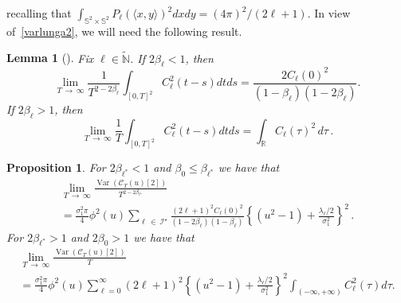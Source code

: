 \documentclass[10pt]{amsart}
\newtheorem{lemm}[theo]{Lemma}\newtheorem{prop}[theo]{Proposition}\newtheorem{coro}[theo]{Corollary}\newtheorem{conj}[theo]{Conjecture}
\theoremstyle{definition}\newtheorem{defi}[theo]{Definition}\newtheorem{rema}[theo]{Remark}\newtheorem{exam}[theo]{Example}\newtheorem{exem}[theo]{Example}\newtheorem{nota}[theo]{Notation}
\newcommand{\clI}{\mathcal{I}}
\newcommand{\clC}{\mathcal{C}}
\newcommand{\bbS}{\mathbb{S}}
\newcommand{\bbR}{\mathbb{R}}
\newcommand{\bbN}{\mathbb{N}}
\DeclareMathOperator{\Var}{Var}
\begin{document}
\endgroup
\noindent recalling that $\int_{\bbS^{2}\times \bbS^{2}}P_{\ell }(\langle x,y\rangle)^{2}dxdy = (4\pi)^2/(2\ell+1)$. In view of~\eqref{varlunga2}, we will need the following result.

\begin{lemm}[{\cite[Lem\-ma~4.3]{MRV:20}}]\label{lemma-var2nd}
Fix $\ell \in \widetilde{ \bbN}$. If $2\beta _{\ell}<1$, then
\begin{equation*}
\lim_{T\,\rightarrow\,\infty}\frac{1}{T^{2-2\beta _{\ell }}}
\int_{[0,T]^2}C_{\ell }^{2}(t-s)dtds=\frac{2C_{\ell }(0)^{2}}{ (1-\beta_{\ell})(1-2\beta_{\ell})}\text{.}
\end{equation*}
If $2\beta _{\ell}>1$, then
\begin{equation*}
\lim_{T\,\rightarrow\,\infty}\frac{1}{T}\int_{[0,T]^2}C_{\ell }^{2}(t-s)dtds=\int_{\bbR}C_\ell(\tau)^2\, d\tau\,.
\end{equation*}
\end{lemm}

\begin{prop}\label{prop:var-2nd-chaos}
For $2\beta_{\ell^*}<1$ and $\beta_0\le
\beta_{\ell^*}$ we have that
\begin{multline}
\lim_{T\,\rightarrow\,\infty }\frac{\Var\left(\clC _{T}(u)[2]\right) }{T^{2-2\beta _{\ell^{\star}}}}\\
=\frac{\sigma _{1}^{2}\pi }{4}\phi^{2}(u)\sum_{\ell\,\in\,\clI^\star}\frac{(2\ell+1)^{2}C_
\ell(0)^2}{(1-2\beta_\ell)(1-\beta_\ell)}\left\{\left(u^{2}-1\right)+\frac{\lambda _{\ell}/2}{\sigma_{1}^{2}}\right\}^2\,.
\end{multline}
For $2\beta_{\ell^*} >1$ and $2\beta_0 >1$ we have that
\begin{multline}\label{T2}
\lim_{T\,\rightarrow\,\infty }\frac{\Var\left(\clC _{T}(u)[2]\right) }{T}
\\= \frac{\sigma _{1}^{2}\pi}{4}\phi ^{2}(u)\sum_{\ell=0}^{\infty}(2\ell+1)^{2} \left\{ (u^{2}-1)+\frac{\lambda _{\ell}/2}{\sigma_{1}^{2}}\right\}^2 \int_{(-\infty, +\infty)}C_{\ell }^{2}(\tau)d\tau.
\end{multline}
\end{prop}
\end{document}
